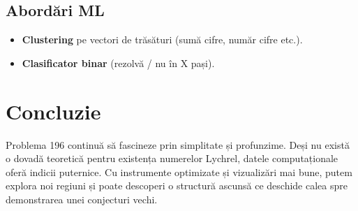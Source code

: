 \documentclass[12pt]{article}
\begin{document}
\subsection{Abordări ML}
\begin{itemize}
    \item \textbf{Clustering} pe vectori de trăsături (sumă cifre, număr cifre etc.).
    \item \textbf{Clasificator binar} (rezolvă / nu în X pași).
\end{itemize}

\section{Concluzie}
Problema 196 continuă să fascineze prin simplitate și profunzime. Deși nu există o dovadă teoretică pentru existența numerelor Lychrel, datele computaționale oferă indicii puternice. Cu instrumente optimizate și vizualizări mai bune, putem explora noi regiuni și poate descoperi o structură ascunsă ce deschide calea spre demonstrarea unei conjecturi vechi.
\end{document}
